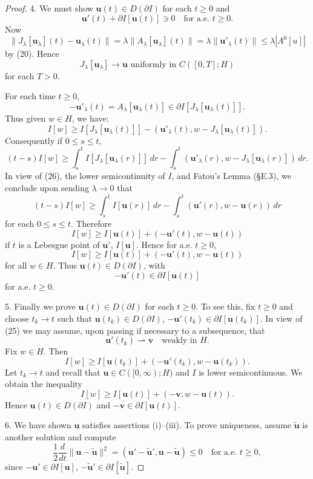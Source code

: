 \begin{proof}
4. We must show $\mathbf{u}(t) \in D(\partial I)$ for each $t \geq 0$ and
\[
\mathbf{u}'(t) + \partial I[\mathbf{u}(t)] \ni 0 \quad \text{for a.e. } t \geq 0.
\]
Now
\[
\|J_\lambda[\mathbf{u}_\lambda](t) - \mathbf{u}_\lambda(t)\| = \lambda\|A_\lambda[\mathbf{u}_\lambda](t)\| = \lambda\|\mathbf{u}'_\lambda(t)\| \leq \lambda|A^0[u]|
\]
by (20). Hence
\[
J_\lambda[\mathbf{u}_\lambda] \to \mathbf{u} \text{ uniformly in } C([0,T]; H)
\tag{26}
\]
for each $T > 0$.

For each time $t \geq 0$,
\[
-\mathbf{u}'_\lambda(t) = A_\lambda[\mathbf{u}_\lambda(t)] \in \partial I[J_\lambda[\mathbf{u}_\lambda(t)]].
\]
Thus given $w \in H$, we have:
\[
I[w] \geq I[J_\lambda[\mathbf{u}_\lambda(t)]] - (\mathbf{u}'_\lambda(t), w - J_\lambda[\mathbf{u}_\lambda(t)]).
\]
Consequently if $0 \leq s \leq t$,
\[
(t - s)I[w] \geq \int_s^t I[J_\lambda[\mathbf{u}_\lambda(r)]] \, dr - \int_s^t (\mathbf{u}'_\lambda(r), w - J_\lambda[\mathbf{u}_\lambda(r)]) \, dr.
\]
In view of (26), the lower semicontinuity of $I$, and Fatou's Lemma (\S E.3), we conclude upon sending $\lambda \to 0$ that
\[
(t - s)I[w] \geq \int_s^t I[\mathbf{u}(r)] \, dr - \int_s^t (\mathbf{u}'(r), w - \mathbf{u}(r)) \, dr
\]
for each $0 \leq s \leq t$. Therefore
\[
I[w] \geq I[\mathbf{u}(t)] + (-\mathbf{u}'(t), w - \mathbf{u}(t))
\]
if $t$ is a Lebesgue point of $\mathbf{u}'$, $I[\mathbf{u}]$. Hence for a.e. $t \geq 0$,
\[
I[w] \geq I[\mathbf{u}(t)] + (-\mathbf{u}'(t), w - \mathbf{u}(t))
\]
for all $w \in H$. Thus $\mathbf{u}(t) \in D(\partial I)$, with
\[
-\mathbf{u}'(t) \in \partial I[\mathbf{u}(t)]
\]
for a.e. $t \geq 0$.

5. Finally we prove $\mathbf{u}(t) \in D(\partial I)$ for each $t \geq 0$. To see this, fix $t \geq 0$ and choose $t_k \to t$ such that $\mathbf{u}(t_k) \in D(\partial I)$, $-\mathbf{u}'(t_k) \in \partial I[\mathbf{u}(t_k)]$. In view of (25) we may assume, upon passing if necessary to a subsequence, that
\[
\mathbf{u}'(t_k) \rightharpoonup \mathbf{v} \quad \text{weakly in } H.
\]
Fix $w \in H$. Then
\[
I[w] \geq I[\mathbf{u}(t_k)] + (-\mathbf{u}'(t_k), w - \mathbf{u}(t_k)).
\]
Let $t_k \to t$ and recall that $\mathbf{u} \in C([0, \infty); H)$ and $I$ is lower semicontinuous. We obtain the inequality
\[
I[w] \geq I[\mathbf{u}(t)] + (-\mathbf{v}, w - \mathbf{u}(t)).
\]
Hence $\mathbf{u}(t) \in D(\partial I)$ and $-\mathbf{v} \in \partial I[\mathbf{u}(t)]$.

6. We have shown $\mathbf{u}$ satisfies assertions (i)--(iii). To prove uniqueness, assume $\tilde{\mathbf{u}}$ is another solution and compute
\[
\frac{1}{2} \frac{d}{dt} \|\mathbf{u} - \tilde{\mathbf{u}}\|^2 = (\mathbf{u}' - \tilde{\mathbf{u}}', \mathbf{u} - \tilde{\mathbf{u}}) \leq 0 \quad \text{for a.e. } t \geq 0,
\]
since $-\mathbf{u}' \in \partial I[\mathbf{u}]$, $-\tilde{\mathbf{u}}' \in \partial I[\tilde{\mathbf{u}}]$.
\end{proof}

